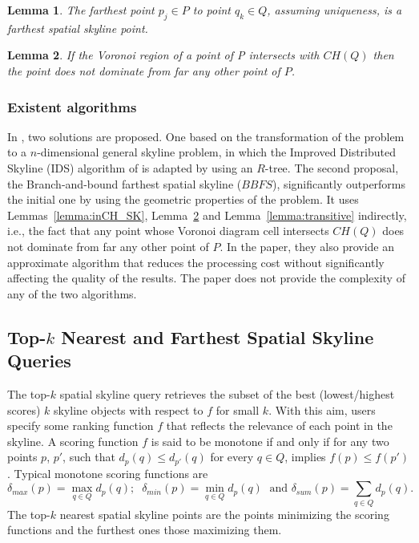 \documentclass[11pt,onecolumn]{elsart3p}
\newtheorem{lemma}{Lemma}
\begin{document}
        \begin{lemma}  The farthest point $p_j \in P$  to point $q_k \in Q$, assuming uniqueness, is a farthest spatial skyline point. \label{lemma:clossest_point}\end{lemma}\vspace{0.6em}

        \begin{lemma} If the Voronoi region of a point of P intersects with $CH(Q)$ then the point does not dominate from far any other point of $P$. \label{lemma:FVoronoi} \end{lemma} \vspace{0.6em}

\subsubsection{Existent algorithms}

In \cite{YLIH13}, two solutions are proposed. One based on the transformation of the problem to a $n$-dimensional general skyline problem, in which the Improved Distributed Skyline (IDS) algorithm of \cite{BGZ04} is adapted by using an $R$-tree. The second proposal, the Branch-and-bound farthest spatial skyline ($BBFS$),  significantly outperforms the initial one by using the geometric properties of the problem. It uses Lemmas~\ref{lemma:inCH_SK}, Lemma~\ref{lemma:FVoronoi} and Lemma~\ref{lemma:transitive} indirectly, i.e., the fact that any point whose Voronoi diagram cell intersects $CH(Q)$ does not dominate from far any other point of $P$. In the paper, they also provide an approximate algorithm that reduces the processing cost without significantly affecting the quality of the results.
The paper does not provide the complexity of any of the two algorithms.


\subsection{Top-$k$ Nearest and Farthest Spatial Skyline Queries}

The top-$k$ spatial skyline query retrieves the subset of the best (lowest/highest scores) $k$ skyline objects with respect to $f$ for small $k$. With this aim, users specify some ranking function $f$ that reflects the relevance of each point in the skyline. A scoring function $f$ is said to be monotone if and only if for any two points $p$, $p'$, such that $d_p(q) \le d_{p'}(q)$ for every $q \in Q$, implies $f(p) \le f(p')$.
Typical monotone scoring functions are $$\delta_{max}(p) = \max_{q \in Q} d_p(q); \;\; \delta_{min}(p) = \min_{q \in Q} d_p(q)  \; \text{ and } \delta_{sum}(p) = \sum_{q \in Q} d_p(q).$$
The top-$k$ nearest spatial skyline points are the points minimizing the scoring functions and the furthest ones those maximizing them.\\
\end{document}
